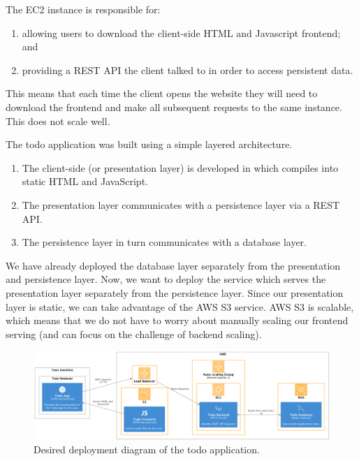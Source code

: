 \documentclass{csse4400}
\begin{document}

The EC2 instance is responsible for:
\begin{enumerate}
  \item allowing users to download the client-side HTML and Javascript frontend; and
  \item providing a REST API the client talked to in order to access persistent data.
\end{enumerate}
This means that each time the client opens the website they will need to download the frontend and make all subsequent requests to the same instance.
This does not scale well.

The todo application was built using a simple layered architecture.
\begin{enumerate}
  \item The client-side (or presentation layer) is developed in  which compiles into static HTML and JavaScript.
  \item The presentation layer communicates with a  persistence layer via a REST API.
  \item The persistence layer in turn communicates with a  database layer.
\end{enumerate}

We have already deployed the database layer separately from the presentation and persistence layer.
Now, we want to deploy the service which serves the presentation layer separately from the persistence layer.
Since our presentation layer is static,
we can take advantage of the AWS S3 service.
AWS S3 is scalable, which means that we do not have to worry about manually scaling our frontend serving (and can focus on the challenge of backend scaling).

\begin{figure}[ht]
\includegraphics[width=\textwidth]{diagrams/SimpleS3Deployment}
\caption{Desired deployment diagram of the todo application.}
\end{figure}
\end{document}

